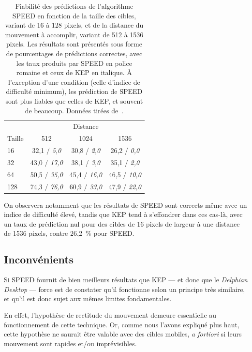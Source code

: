 	\begin{table}
	\centering
	\begin{tabular}{l | c c c}
				& \multicolumn{3}{c}{Distance}	\\
		Taille	& 512					& 1024					& 1536					\bigstrut[b] \\ \hline
		16		& 32,1 / \emph{5,0}		& 30,8 / \emph{2,0}		& 26,2 / \emph{0,0}		\bigstrut[t] \\
		32		& 43,0 / \emph{17,0}	& 38,1 / \emph{3,0}		& 35,1 / \emph{2,0}		\\
		64		& 50,5 / \emph{35,0}	& 45,4 / \emph{16,0}	& 46,5 / \emph{10,0}	\\
		128		& 74,3 / \emph{76,0}	& 60,9 / \emph{33,0}	& 47,9 / \emph{22,0}	\\
	\end{tabular}
	\caption[SPEED -- performances comparées à celles de KEP]{Fiabilité des prédictions de l'algorithme SPEED en fonction de la taille des cibles, variant de 16 à 128 pixels, et de la distance du mouvement à accomplir, variant de 512 à 1536 pixels. Les résultats sont présentés sous forme de pourcentages de prédictions correctes, avec les taux produits par SPEED en police romaine et ceux de KEP en italique. À l'exception d'une condition (celle d'indice de difficulté minimum), les prédiction de SPEED sont plus fiables que celles de KEP, et souvent de beaucoup. Données tirées de~\cite{wonner2011speed}.}
	\label{tab:speedingPastKep}
	\end{table}
	
	On observera notamment que les résultats de SPEED sont corrects même avec un indice de difficulté élevé, tandis que KEP tend à s'effondrer dans ces cas-là, avec un taux de prédiction nul pour des cibles de 16 pixels de largeur à une distance de 1536 pixels, contre 26,2~\%{} pour SPEED.
			
	\subsection{Inconvénients}
	Si SPEED fournit de bien meilleurs résultats que KEP --- et donc que le \emph{Delphian Desktop} --- force est de constater qu'il fonctionne selon un principe très similaire, et qu'il est donc sujet aux mêmes limites fondamentales.
	
	En effet, l'hypothèse de rectitude du mouvement demeure essentielle au fonctionnement de cette technique. Or, comme nous l'avons expliqué plus haut, cette hypothèse ne saurait être valable avec des cibles mobiles, \emph{a fortiori} si leurs mouvement sont rapides et/ou imprévisibles.
	
